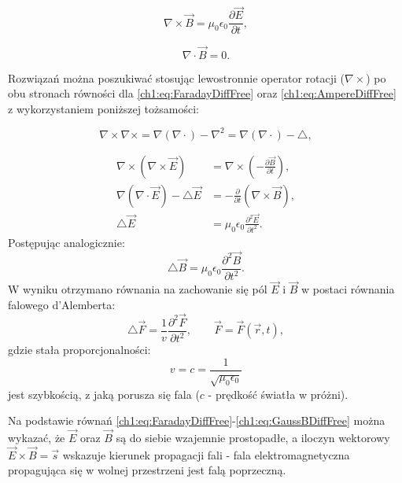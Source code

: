 \begin{equation}
\nabla\times\vec{B} = \mu_0\epsilon_0\frac{\partial\vec{E}}{\partial t},
\label{ch1:eq:AmpereDiffFree}
\end{equation}

\begin{equation}
\nabla\cdot\vec{B} = 0.
\label{ch1:eq:GaussBDiffFree}
\end{equation}


Rozwiązań można poszukiwać stosując lewostronnie operator rotacji ($\nabla\times$) po obu stronach równości dla \eqref{ch1:eq:FaradayDiffFree} oraz \eqref{ch1:eq:AmpereDiffFree} z wykorzystaniem poniższej tożsamości:

\begin{equation}
\nabla\times\nabla\times = \nabla(\nabla\cdot) - \nabla^2 = \nabla(\nabla\cdot) - \triangle,
\label{ch1:eq:rotrot}
\end{equation}

\begin{align}
\nabla\times\left( \nabla\times\vec{E} \right) &= \nabla\times\left( -\frac{\partial\vec{B}}{\partial t} \right),\nonumber\\
\nabla(\nabla\cdot\vec{E}) - \triangle\vec{E} &= -\frac{\partial}{\partial t}\left(\nabla\times\vec{B} \right),\nonumber\\
\triangle\vec{E} &= \mu_0\epsilon_0\frac{\partial^2\vec{E}}{\partial t^2}.
\label{ch1:eq:ElectricWaveEq}
\end{align}
Postępując analogicznie:
\begin{equation}
\triangle\vec{B} = \mu_0\epsilon_0\frac{\partial^2\vec{B}}{\partial t^2}.
\label{ch1:eq:MagneticWaveEq}
\end{equation}
W wyniku otrzymano równania na zachowanie się pól $\vec{E}$ i $\vec{B}$ w postaci równania falowego d'Alemberta:
\begin{equation}
\triangle\vec{F} = \frac{1}{v}\frac{\partial^2\vec{F}}{\partial t^2},\qquad \vec{F} = \vec{F}\left(\vec{r}, t \right),
\label{ch1:eq:dAlambertWaveEq}
\end{equation}
gdzie stała proporcjonalności:
\begin{equation}
v = c = \frac{1}{\sqrt{\mu_0\epsilon_0}}
\label{ch1:eq:speedOfLight}
\end{equation}
jest szybkością, z jaką porusza się fala ($c$ - prędkość światła w próżni).

Na podstawie równań \eqref{ch1:eq:FaradayDiffFree}-\eqref{ch1:eq:GaussBDiffFree} można wykazać, że $\vec{E}$ oraz $\vec{B}$ są do siebie wzajemnie prostopadłe, a iloczyn wektorowy $\vec{E}\times\vec{B} = \vec{s}$ wskazuje kierunek propagacji fali - fala elektromagnetyczna propagująca się w wolnej przestrzeni jest falą poprzeczną. 


